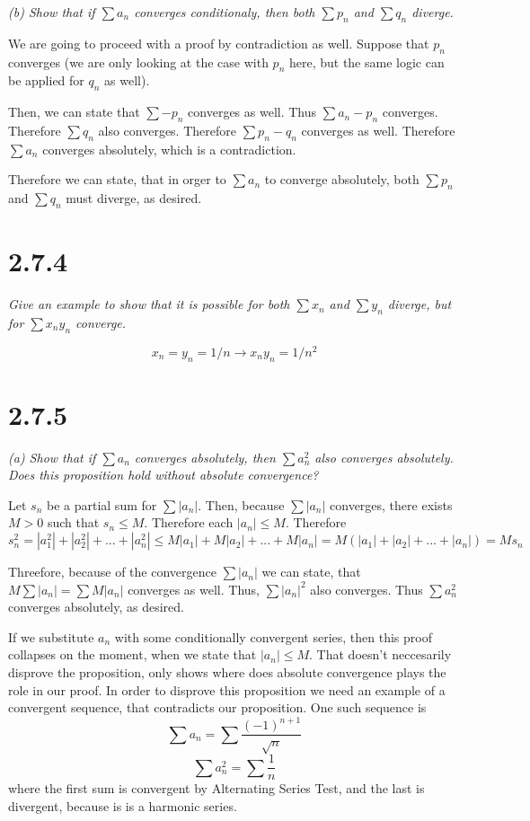 \documentclass[11pt,oneside,titlepage]{book}
\begin{document}
\textit{(b) Show that if $\sum a_n$ converges conditionaly, then both
  $\sum p_n$ and $\sum q_n$ diverge.}

We are going to proceed with a proof by contradiction as well. Suppose that
$p_n$ converges (we are only looking at the case with $p_n$ here, but the
same logic can be applied for $q_n$ as well).

Then, we can state that $\sum -p_n$ converges as well. Thus $\sum a_n - p_n$
converges. Therefore $\sum q_n$ also converges. Therefore $\sum p_n - q_n$
converges as well. Therefore $\sum a_n$ converges absolutely, which is a
contradiction.

Therefore we can state, that in orger to $\sum a_n$ to converge absolutely,
both $\sum p_n$ and $\sum q_n$ must diverge, as desired.

\section*{2.7.4}
\textit{Give an example to show that it is possible for both $\sum x_n$ and
  $\sum y_n$ diverge, but for $\sum x_n y_n$ converge.}

$$x_n = y_n = 1/n \to x_n y_n = 1/n^2$$

\section*{2.7.5}
\textit{(a) Show that if $\sum a_n$ converges absolutely, then $\sum a_n^2$
  also converges absolutely. Does this proposition hold without absolute
  convergence?}

Let $s_n$ be a partial sum for $\sum |a_n|$. Then, because $\sum |a_n|$
converges, there exists $M > 0$ such that $s_n \leq M$. Therefore
each $|a_n| \leq M$. Therefore
$$s_n^2 = |a_1^2| + |a_2^2| + ... + |a_n^2| \leq M|a_1| + M|a_2| + ... +
M|a_n| = M(|a_1| + |a_2| + ... + |a_n|) = Ms_n$$

Threefore, because of the convergence $\sum |a_n|$ we can state, that
$M\sum |a_n| = \sum M |a_n|$ converges as well. Thus, $\sum |a_n|^2$ also
converges. Thus $\sum a_n^2$ converges absolutely, as desired.

If we substitute $a_n$ with some conditionally convergent series, then
this proof collapses on the moment, when we state that $|a_n| \leq M$. That
doesn't neccesarily disprove the proposition, only shows where does
absolute convergence plays the role  in our proof. In order to disprove
this proposition we need an example of a convergent sequence, that contradicts
our proposition. One such sequence is
$$\sum a_n = \sum \frac{(-1)^{n + 1}}{\sqrt{n}}$$
$$\sum a_n^2 = \sum \frac{1}{n}$$
where the first sum is convergent by Alternating Series Test, and the last
is divergent, because is is a harmonic series.
\end{document}
